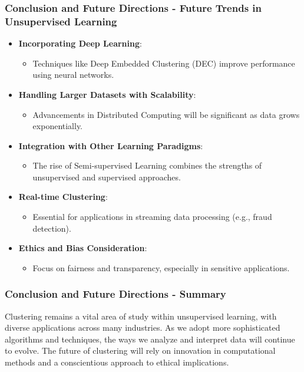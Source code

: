\documentclass[aspectratio=169]{beamer}
\begin{document}
\begin{frame}[fragile]
    \frametitle{Conclusion and Future Directions - Future Trends in Unsupervised Learning}
    \begin{itemize}
        \item \textbf{Incorporating Deep Learning}:
        \begin{itemize}
            \item Techniques like Deep Embedded Clustering (DEC) improve performance using neural networks.
        \end{itemize}
        \item \textbf{Handling Larger Datasets with Scalability}:
        \begin{itemize}
            \item Advancements in Distributed Computing will be significant as data grows exponentially.
        \end{itemize}
        \item \textbf{Integration with Other Learning Paradigms}:
        \begin{itemize}
            \item The rise of Semi-supervised Learning combines the strengths of unsupervised and supervised approaches.
        \end{itemize}
        \item \textbf{Real-time Clustering}:
        \begin{itemize}
            \item Essential for applications in streaming data processing (e.g., fraud detection).
        \end{itemize}
        \item \textbf{Ethics and Bias Consideration}:
        \begin{itemize}
            \item Focus on fairness and transparency, especially in sensitive applications.
        \end{itemize}
    \end{itemize}
\end{frame}

\begin{frame}[fragile]
    \frametitle{Conclusion and Future Directions - Summary}
    Clustering remains a vital area of study within unsupervised learning, with diverse applications across many industries. As we adopt more sophisticated algorithms and techniques, the ways we analyze and interpret data will continue to evolve. The future of clustering will rely on innovation in computational methods and a conscientious approach to ethical implications. 
\end{frame}
\end{document}
